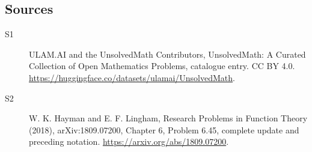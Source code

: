 \documentclass[11pt]{article}
\begin{document}
\subsection{Sources}
\begin{description}
\item[\hypertarget{source:statement:1}{S1}] ULAM.AI and the UnsolvedMath Contributors, UnsolvedMath: A Curated Collection of Open Mathematics Problems, catalogue entry. CC BY 4.0. \url{https://huggingface.co/datasets/ulamai/UnsolvedMath}.
\item[\hypertarget{source:statement:2}{S2}] W. K. Hayman and E. F. Lingham, Research Problems in Function Theory (2018), arXiv:1809.07200, Chapter 6, Problem 6.45, complete update and preceding notation. \url{https://arxiv.org/abs/1809.07200}.
\end{description}
\label{end:statement}
\end{document}
